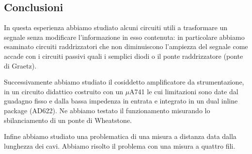 \subsection*{Conclusioni}
In questa esperienza abbiamo studiato alcuni circuiti utili a trasformare un segnale senza modificare l'informazione in esso contenuta: in particolare abbiamo esaminato circuiti raddrizzatori che non diminuiscono l'ampiezza del segnale come accade con i circuiti passivi quali i semplici diodi o il ponte raddrizzatore (ponte di Graetz).

Successivamente abbiamo studiato il cosiddetto amplificatore da strumentazione, in un circuito didattico costruito con un $\mu$A741 le cui limitazioni sono date dal guadagno fisso e dalla bassa impedenza in entrata e integrato in un dual inline package (AD622).
Ne abbiamo testato il funzionamento misurando lo sbilanciamento di un ponte di Wheatstone.

Infine abbiamo studiato una problematica di una misura a distanza data dalla lunghezza dei cavi.
Abbiamo risolto il problema con una misura a quattro fili.
